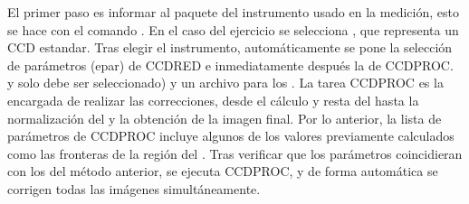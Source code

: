 \documentclass[12pt]{article}
\begin{document}
El primer paso es informar al paquete del instrumento usado en la medición, esto se hace con el comando . En el caso del ejercicio se selecciona , que representa un CCD estandar. Tras elegir el instrumento, automáticamente se pone la selección de parámetros (epar) de CCDRED e inmediatamente después la de CCDPROC.  y solo debe ser seleccionado) y un archivo para los . La tarea CCDPROC es la encargada de realizar las correcciones, desde el cálculo y resta del  hasta la normalización del  y la obtención de la imagen final. Por lo anterior, la lista de parámetros de CCDPROC incluye algunos de los valores previamente calculados como las fronteras de la región del . Tras verificar que los parámetros coincidieran con los del método anterior, se ejecuta CCDPROC, y de forma automática se corrigen todas las imágenes simultáneamente. 
















{}

\end{document}
